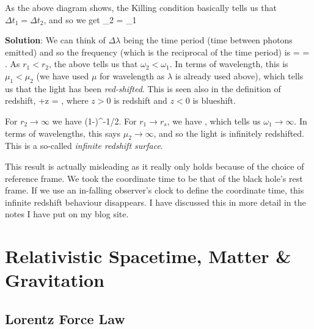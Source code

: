 As the above diagram shows, the Killing condition basically tells us that $\Delta t_1 = \Delta t_2$, and so we get 
\bse 
    \Delta \lambda_2 =  \Delta \lambda_1
\ese 


\textbf{Solution}: We can think of $\Delta \lambda$ being the time period (time between photons emitted) and so the frequency (which is the reciprocal of the time period) is 
\bse 
     =  = .
\ese 
As $r_1<r_2$, the above tells us that $\omega_2<\omega_1$. In terms of wavelength, this is $\mu_1<\mu_2$ (we have used $\mu$ for wavelength as $\lambda$ is already used above), which tells us that the light has been \textit{red-shifted}. This is seen also in the definition of redshift, 
+z = ,
\ese 
where $z>0$ is redshift and $z<0$ is blueshift. 

For $r_2\to \infty$ we have 
\bse 
     \to  \bigg(1-\bigg)^{-1/2}.
\ese 
For $r_1\to r_s$, we have 
\bse 
     \to \infty, 
\ese 
which tells us $\omega_1\to \infty$. In terms of wavelengths, this says $\mu_2\to\infty$, and so the light is infinitely redshifted. This is a so-called \textit{infinite redshift surface}.

This result is actually misleading as it really only holds because of the choice of reference frame. We took the coordinate time to be that of the black hole's rest frame. If we use an in-falling observer's clock to define the coordinate time, this infinite redshift behaviour disappears. I have discussed this in more detail in the notes I have put on my blog site. 

\section{Relativistic Spacetime, Matter \& Gravitation}

\subsection{Lorentz Force Law}


